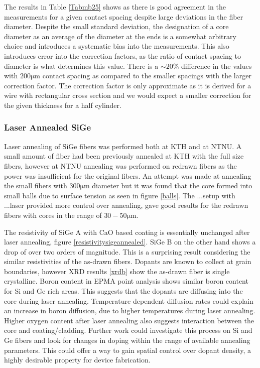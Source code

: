 The results in Table \ref{Tabmb25} shows as there is good agreement in the measurements for a given contact spacing despite large deviations in the fiber diameter. Despite the small standard deviation, the designation of a core diameter as an average of the diameter at the ends is a somewhat arbitrary choice and introduces a systematic bias into the measurements.  This also introduces error into the correction factors, as the ratio of contact spacing to diameter is what determines this value.  There is a  $\sim 20\%$ difference in the values with $200 \si{\micro\meter}$ contact spacing as compared to the smaller spacings with the larger correction factor. The correction factor is only approximate as it is derived for a wire with rectangular cross section and we would expect a smaller correction for the given thickness for a half cylinder.  



\FloatBarrier
\subsubsection{Laser Annealed SiGe}
Laser annealing of SiGe fibers was performed both at KTH and at NTNU. A small amount of fiber had been previously annealed at KTH with the full size fibers, however at NTNU annealing was performed on redrawn fibers as the power was insufficient for the original fibers. An attempt was made at annealing the small fibers with $300 \si{\micro\meter}$ diameter but it was found that the core formed into small balls due to surface tension \cite{Fokine2017LaserFibers} as seen in figure \ref{balls}. The ...setup with ...laser provided more control over annealing, gave good results for the redrawn fibers with cores in the range of $30-50\si{\micro\meter}$. 

The resistivity of SiGe A with CaO based coating is essentially unchanged after laser annealing, figure \ref{resistivitysigeannealed}. SiGe B on the other hand shows a drop of over two orders of magnitude. This is a surprising result considering the similar resistivities of the as-drawn fibers. Dopants are known to collect at grain boundaries, however XRD results \ref{xrdb} show the as-drawn fiber is single crystalline. Boron content in EPMA point analysis shows similar boron content for Si and Ge rich areas. This suggests that the dopants are diffusing into the core during laser annealing. Temperature dependent diffusion rates could explain an increase in boron diffusion, due to higher temperatures during laser annealing. Higher oxygen content after laser annealing also suggests interaction between the core and coating/cladding. Further work could investigate this process on Si and Ge fibers and look for changes in doping within the range of available annealing parameters. This could offer a way to gain spatial control over dopant density, a highly desirable property for device fabrication.


